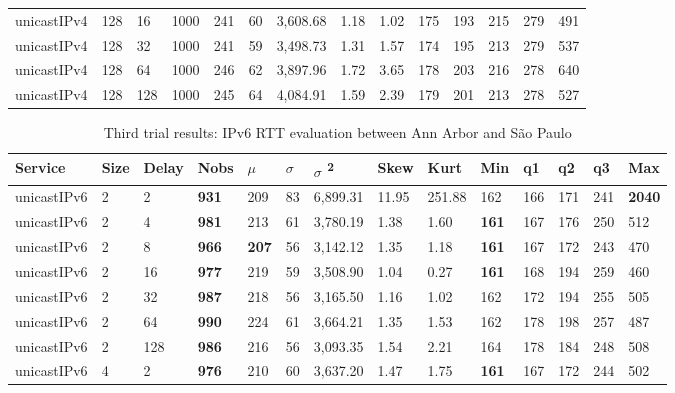 \begin{table}[!htb]
\begin{tabular}{@{}llllllllllllll@{}}
		unicastIPv4 & 128          & 16    & 1000 & 241  & 60  & 3,608.68 & 1.18     & 1.02     & 175 & 193 & 215 & 279 & 491  \\
		unicastIPv4 & 128          & 32    & 1000 & 241  & 59  & 3,498.73 & 1.31     & 1.57     & 174 & 195 & 213 & 279 & 537  \\
		unicastIPv4 & 128          & 64    & 1000 & 246  & 62  & 3,897.96 & 1.72     & 3.65     & 178 & 203 & 216 & 278 & 640  \\
		unicastIPv4 & 128          & 128   & 1000 & 245  & 64  & 4,084.91 & 1.59     & 2.39     & 179 & 201 & 213 & 278 & 527  \\ \bottomrule
	\end{tabular}
\end{table}



\begin{table}[!htb]
	\centering
	\caption{Third trial results: IPv6 RTT evaluation between Ann Arbor and São Paulo}
	\label{tab:thirdtrialarbsaoipv6}
	\begin{tabular}{@{}llllllllllllll@{}}
		\toprule
		Service    & Size & Delay & Nobs & $\mu$ & $\sigma$  & $\sigma$ \textsuperscript{2} & Skew & Kurt & Min & q1   & q2   & q3   & Max   \\ \midrule
		unicastIPv6 & 2            & 2     & \textbf{931}  & 209  & 83  & 6,899.31 & 11.95    & 251.88   & 162 & 166 & 171 & 241 & \textbf{2040} \\
		unicastIPv6 & 2            & 4     & \textbf{981}  & 213  & 61  & 3,780.19 & 1.38     & 1.60     & \textbf{161} & 167 & 176 & 250 & 512  \\
		unicastIPv6 & 2            & 8     & \textbf{966}  & \textbf{207}  & 56  & 3,142.12 & 1.35     & 1.18     & \textbf{161} & 167 & 172 & 243 & 470  \\
		unicastIPv6 & 2            & 16    & \textbf{977}  & 219  & 59  & 3,508.90 & 1.04     & 0.27     & \textbf{161} & 168 & 194 & 259 & 460  \\
		unicastIPv6 & 2            & 32    & \textbf{987}  & 218  & 56  & 3,165.50 & 1.16     & 1.02     & 162 & 172 & 194 & 255 & 505  \\
		unicastIPv6 & 2            & 64    & \textbf{990}  & 224  & 61  & 3,664.21 & 1.35     & 1.53     & 162 & 178 & 198 & 257 & 487  \\
		unicastIPv6 & 2            & 128   & \textbf{986}  & 216  & 56  & 3,093.35 & 1.54     & 2.21     & 164 & 178 & 184 & 248 & 508  \\ \hline
		unicastIPv6 & 4            & 2     & \textbf{976}  & 210  & 60  & 3,637.20 & 1.47     & 1.75     & \textbf{161} & 167 & 172 & 244 & 502  \\

\end{tabular}
\end{table}
